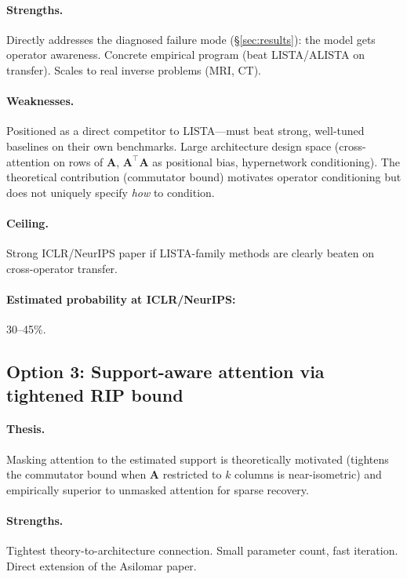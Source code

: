 \documentclass[11pt]{article}
\newcommand{\A}{\mathbf{A}}
\begin{document}
\paragraph{Strengths.}
Directly addresses the diagnosed failure mode
(\S\ref{sec:results}): the model gets operator awareness.
Concrete empirical program (beat LISTA/ALISTA on transfer).
Scales to real inverse problems (MRI, CT).

\paragraph{Weaknesses.}
Positioned as a direct competitor to LISTA---must beat strong,
well-tuned baselines on their own benchmarks.
Large architecture design space (cross-attention on rows of
$\A$, $\A^\top\A$ as positional bias, hypernetwork conditioning).
The theoretical contribution (commutator bound) motivates
operator conditioning but does not uniquely specify
\emph{how} to condition.

\paragraph{Ceiling.}
Strong ICLR/NeurIPS paper if LISTA-family methods are clearly
beaten on cross-operator transfer.

\paragraph{Estimated probability at ICLR/NeurIPS:} 30--45\%.

\subsection{Option 3: Support-aware attention via tightened RIP bound}

\paragraph{Thesis.}
Masking attention to the estimated support is theoretically
motivated (tightens the commutator bound when $\A$ restricted
to $k$ columns is near-isometric) and empirically superior
to unmasked attention for sparse recovery.

\paragraph{Strengths.}
Tightest theory-to-architecture connection.
Small parameter count, fast iteration.
Direct extension of the Asilomar paper.
\end{document}
